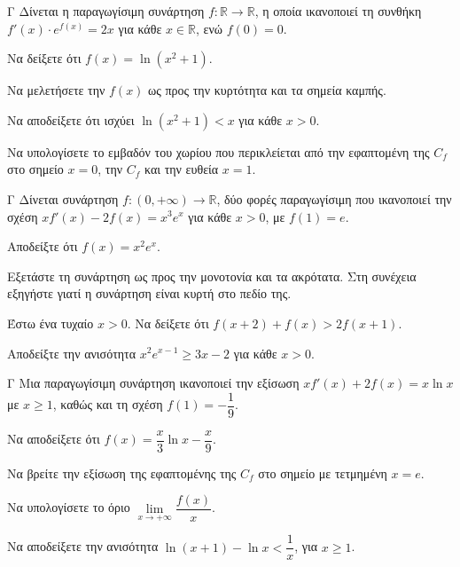 \begin{thema}{Γ}
Δίνεται η παραγωγίσιμη συνάρτηση $f: \mathbb{R} \to \mathbb{R}$, η οποία ικανοποιεί τη συνθήκη $f'(x) \cdot e^{f(x)} = 2x$ για κάθε $x \in \mathbb{R}$, ενώ $f(0) = 0$.
\begin{erwthma}
  \item Να δείξετε ότι $f(x)=\ln\left(x^2+1\right)$.
  \item Να μελετήσετε την $f(x)$ ως προς την κυρτότητα και τα σημεία καμπής.
  \item Να αποδείξετε ότι ισχύει $\ln(x^2+1) < x$ για κάθε $x>0$.
  \item Να υπολογίσετε το εμβαδόν του χωρίου που περικλείεται από την εφαπτομένη της $C_f$ στο σημείο $x=0$, την $C_f$ και την ευθεία $x=1$.
\end{erwthma}
\end{thema}

\begin{thema}{Γ}
Δίνεται συνάρτηση $f:(0,+\infty)\to\mathbb{R}$, δύο φορές παραγωγίσιμη που ικανοποιεί την σχέση $x f'(x) - 2f(x) = x^3 e^x$ για κάθε $x > 0$, με $f(1) = e$.
\begin{erwthma}
  \item Αποδείξτε ότι $f(x) = x^2 e^x$.
  \item Εξετάστε τη συνάρτηση ως προς την μονοτονία και τα ακρότατα. Στη συνέχεια εξηγήστε γιατί η συνάρτηση είναι κυρτή στο πεδίο της.
  \item Έστω ένα τυχαίο $x > 0$. Να δείξετε ότι $f(x+2) + f(x) > 2f(x+1)$.
  \item Αποδείξτε την ανισότητα $x^2 e^{x-1} \ge 3x - 2$ για κάθε $x > 0$.
\end{erwthma}
\end{thema}

\begin{thema}{Γ}
Μια παραγωγίσιμη συνάρτηση ικανοποιεί την εξίσωση $x f'(x) + 2 f(x) = x \ln x$ με $x \ge 1$, καθώς και τη σχέση $f(1) = -\dfrac{1}{9}$.
\begin{erwthma}
  \item Να αποδείξετε ότι $f(x) = \dfrac{x}{3}\ln x - \dfrac{x}{9}$.
  \item Να βρείτε την εξίσωση της εφαπτομένης της $C_f$ στο σημείο με τετμημένη $x=e$.
  \item Να υπολογίσετε το όριο $\lim\limits_{x \to +\infty} \dfrac{f(x)}{x}$.
  \item Να αποδείξετε την ανισότητα $\ln(x+1) - \ln x < \dfrac{1}{x}$, για $x \ge 1$.
\end{erwthma}
\end{thema}

